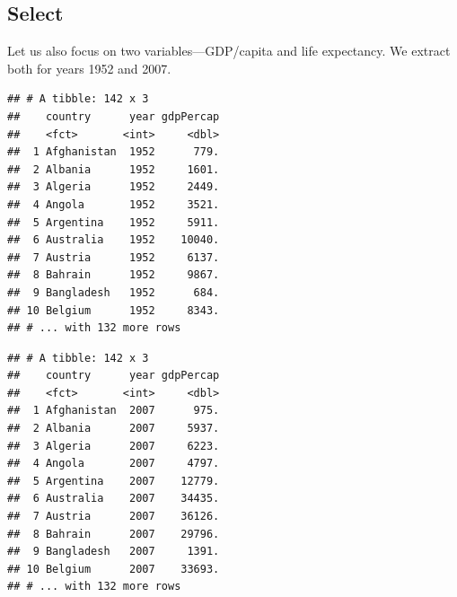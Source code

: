 \documentclass[11pt,]{article}
\newenvironment{Shaded}{\begin{snugshade}}{\end{snugshade}}
\newcommand{\KeywordTok}[1]{\textcolor[rgb]{0.13,0.29,0.53}{\textbf{#1}}}
\newcommand{\DecValTok}[1]{\textcolor[rgb]{0.00,0.00,0.81}{#1}}
\newcommand{\StringTok}[1]{\textcolor[rgb]{0.31,0.60,0.02}{#1}}
\newcommand{\OperatorTok}[1]{\textcolor[rgb]{0.81,0.36,0.00}{\textbf{#1}}}
\newcommand{\NormalTok}[1]{#1}
\begin{document}
\subsection{Select}\label{select}

Let us also focus on two variables---GDP/capita and life expectancy. We
extract both for years 1952 and 2007.

\begin{Shaded}
\end{Shaded}

\begin{verbatim}
## # A tibble: 142 x 3
##    country      year gdpPercap
##    <fct>       <int>     <dbl>
##  1 Afghanistan  1952      779.
##  2 Albania      1952     1601.
##  3 Algeria      1952     2449.
##  4 Angola       1952     3521.
##  5 Argentina    1952     5911.
##  6 Australia    1952    10040.
##  7 Austria      1952     6137.
##  8 Bahrain      1952     9867.
##  9 Bangladesh   1952      684.
## 10 Belgium      1952     8343.
## # ... with 132 more rows
\end{verbatim}

\begin{Shaded}
\end{Shaded}

\begin{verbatim}
## # A tibble: 142 x 3
##    country      year gdpPercap
##    <fct>       <int>     <dbl>
##  1 Afghanistan  2007      975.
##  2 Albania      2007     5937.
##  3 Algeria      2007     6223.
##  4 Angola       2007     4797.
##  5 Argentina    2007    12779.
##  6 Australia    2007    34435.
##  7 Austria      2007    36126.
##  8 Bahrain      2007    29796.
##  9 Bangladesh   2007     1391.
## 10 Belgium      2007    33693.
## # ... with 132 more rows
\end{verbatim}

\begin{Shaded}
\end{Shaded}
\end{document}
